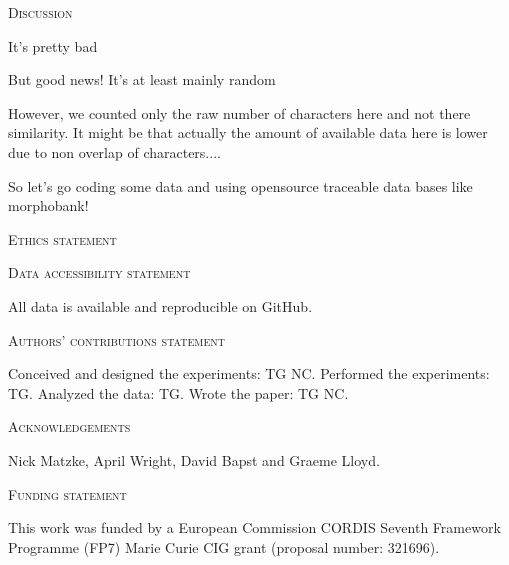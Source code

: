 \documentclass[12pt,letterpaper]{article}
\renewcommand{\section}[1]{%
\bigskip
\begin{center}
\begin{Large}
\normalfont\scshape #1
\medskip
\end{Large}
\end{center}}
\renewcommand{\subsection}[1]{%
\bigskip
\begin{center}
\begin{large}
\normalfont\itshape #1
\end{large}
\end{center}}
\begin{document}
%
%

\section{Discussion}

It's pretty bad

But good news! It's at least mainly random

However, we counted only the raw number of characters here and not there similarity. It might be that actually the amount of available data here is lower due to non overlap of characters....

So let's go coding some data and using opensource traceable data bases like morphobank!



\section{Ethics statement}
\section{Data accessibility statement}
All data is available and reproducible on GitHub.
\section{Authors’ contributions statement}
Conceived and designed the experiments: TG NC. Performed the experiments: TG. Analyzed the data: TG. Wrote the paper: TG NC.
\section{Acknowledgements}
Nick Matzke, April Wright, David Bapst and Graeme Lloyd.
\section{Funding statement}
This work was funded by a European Commission CORDIS Seventh Framework Programme (FP7) Marie Curie CIG grant (proposal number: 321696).
\end{document}
